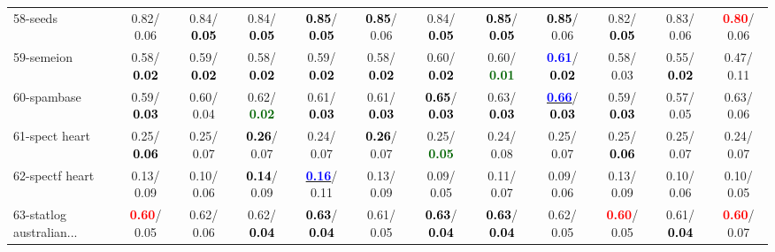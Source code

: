 \begin{table}[h]
\begin{center}
{\begin{tabular}{lc|c|c|c|c|c|c|c|c|c|c}
58-seeds &   0.82/  0.06 &   0.84/\textcolor{black}{\textbf{  0.05}} &   0.84/\textcolor{black}{\textbf{  0.05}} & \textcolor{black}{\textbf{  0.85}}/\textcolor{black}{\textbf{  0.05}} & \textcolor{black}{\textbf{  0.85}}/  0.06 &   0.84/\textcolor{black}{\textbf{  0.05}} & \textcolor{black}{\textbf{  0.85}}/\textcolor{black}{\textbf{  0.05}} & \textcolor{black}{\textbf{  0.85}}/  0.06 &   0.82/\textcolor{black}{\textbf{  0.05}} &   0.83/  0.06 & \textcolor{red}{\textbf{  0.80}}/  0.06 \\
59-semeion &   0.58/\textcolor{black}{\textbf{  0.02}} &   0.59/\textcolor{black}{\textbf{  0.02}} &   0.58/\textcolor{black}{\textbf{  0.02}} &   0.59/\textcolor{black}{\textbf{  0.02}} &   0.58/\textcolor{black}{\textbf{  0.02}} &   0.60/\textcolor{black}{\textbf{  0.02}} &   0.60/\textcolor{darkgreen}{\textbf{  0.01}} & \textcolor{blue}{\textbf{  0.61}}/\textcolor{black}{\textbf{  0.02}} &   0.58/  0.03 &   0.55/\textcolor{black}{\textbf{  0.02}} &   0.47/  0.11 \\
60-spambase &   0.59/\textcolor{black}{\textbf{  0.03}} &   0.60/  0.04 &   0.62/\textcolor{darkgreen}{\textbf{  0.02}} &   0.61/\textcolor{black}{\textbf{  0.03}} &   0.61/\textcolor{black}{\textbf{  0.03}} & \textcolor{black}{\textbf{  0.65}}/\textcolor{black}{\textbf{  0.03}} &   0.63/\textcolor{black}{\textbf{  0.03}} & \underline{\textcolor{blue}{\textbf{  0.66}}}/\textcolor{black}{\textbf{  0.03}} &   0.59/\textcolor{black}{\textbf{  0.03}} &   0.57/  0.05 &   0.63/  0.06 \\ \hline
61-spect heart &   0.25/\textcolor{black}{\textbf{  0.06}} &   0.25/  0.07 & \textcolor{black}{\textbf{  0.26}}/  0.07 &   0.24/  0.07 & \textcolor{black}{\textbf{  0.26}}/  0.07 &   0.25/\textcolor{darkgreen}{\textbf{  0.05}} &   0.24/  0.08 &   0.25/  0.07 &   0.25/\textcolor{black}{\textbf{  0.06}} &   0.25/  0.07 &   0.24/  0.07 \\
62-spectf heart &   0.13/  0.09 &   0.10/  0.06 & \textcolor{black}{\textbf{  0.14}}/  0.09 & \underline{\textcolor{blue}{\textbf{  0.16}}}/  0.11 &   0.13/  0.09 &   0.09/  0.05 &   0.11/  0.07 &   0.09/  0.06 &   0.13/  0.09 &   0.10/  0.06 &   0.10/  0.05 \\
63-statlog australian... & \textcolor{red}{\textbf{  0.60}}/  0.05 &   0.62/  0.06 &   0.62/\textcolor{black}{\textbf{  0.04}} & \textcolor{black}{\textbf{  0.63}}/\textcolor{black}{\textbf{  0.04}} &   0.61/  0.05 & \textcolor{black}{\textbf{  0.63}}/\textcolor{black}{\textbf{  0.04}} & \textcolor{black}{\textbf{  0.63}}/\textcolor{black}{\textbf{  0.04}} &   0.62/  0.05 & \textcolor{red}{\textbf{  0.60}}/  0.05 &   0.61/\textcolor{black}{\textbf{  0.04}} & \textcolor{red}{\textbf{  0.60}}/  0.07 \\

\end{tabular}}
\end{center}
\end{table}
